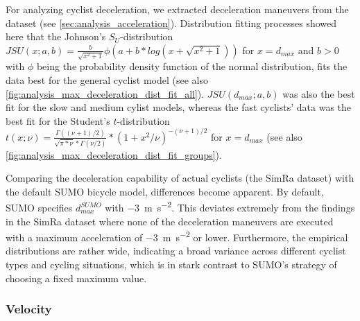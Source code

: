 For analyzing cyclist deceleration, we extracted deceleration maneuvers from the dataset (see \cref{sec:analysis_acceleration}).
Distribution fitting processes showed here that the Johnson's $S_{U}$-distribution~\cite{johnson1949systems} $JSU(x; a,b) = \frac{b}{\sqrt{x^2+1}}\phi(a+b*log(x+\sqrt{x^2+1}))$ for $x=d_{max}$ and $b>0$ with $\phi$ being the probability density function of the normal distribution, fits the data best for the general cyclist model (see also \cref{fig:analysis_max_deceleration_dist_fit_all}).
$JSU(d_{max}; a,b)$ was also the best fit for the slow and medium cylist models, whereas the fast cyclists' data was the best fit for the Student's $t$-distribution~\cite{student1908probable} $t(x; \nu)=\frac{\Gamma((\nu+1)/2)}{\sqrt{\pi*\nu}*\Gamma(\nu/2)}*(1+x^2/\nu)^{-(\nu+1)/2}$ for $x=d_{max}$ (see also \cref{fig:analysis_max_deceleration_dist_fit_groups}).

Comparing the deceleration capability of actual cyclists (the SimRa dataset) with the default SUMO bicycle model, differences become apparent.
By default, SUMO specifies $d_{max}^{SUMO}$ with \SI{-3}{\metre\per\square\second}.
This deviates extremely from the findings in the SimRa dataset where none of the deceleration maneuvers are executed with a maximum acceleration of \SI{-3}{\metre\per\square\second} or lower.
Furthermore, the empirical distributions are rather wide, indicating a broad variance across different cyclist types and cycling situations, which is in stark contrast to SUMO's strategy of choosing a fixed maximum value.

\subsubsection{Velocity}
\label{subsubsec:velocity_preprocessing}
                                                                        
